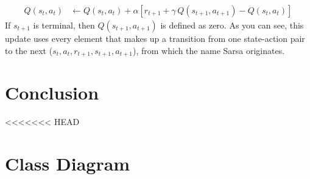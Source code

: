 \documentclass{article}
\begin{document}
\begin{align*}
Q(s_t,a_t) & \leftarrow Q(s_t,a_t) + \alpha \left[ r_{t+1} + \gamma \, Q(s_{t+1},a_{t+1}) - Q(s_t,a_t) \right]
\end{align*}
If $s_{t+1}$ is terminal, then $Q(s_{t+1},a_{t+1})$ is defined as zero. As you can see, this update uses every element that makes up a transition from one state-action pair to the next ($s_t,a_t,r_{t+1},s_{t+1},a_{t+1}$), from which the name Sarsa originates.


\section{Conclusion}

\newpage
\nocite{*}



\newpage
\appendix
\appendixpage
<<<<<<< HEAD
\section{Class Diagram} \label{app:classDiagram}
\appendixpage
\end{document}
